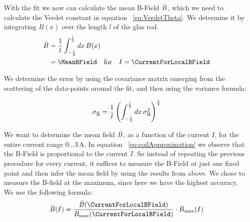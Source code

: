 \documentclass[a4paper,10pt,twocolumn]{article}
\newcommand{\unit}[1]{\, \mathrm{#1}}
\begin{document}
    \newcommand{\lHalf}{\frac{l}{2}}
    \newcommand{\xInteg}{\int_{-\lHalf}^{\lHalf} dx \,}

    With the fit we now can calculate the mean B-Field $\bar{B}$, which we need
    to calculate the Verdet constant in equation ~\eqref{eq:VerdetTheta}.
    We determine it by integrating $B(x)$ over the length $l$ of the glas rod.
    \begin{align}
        \label{eq:meanBFieldInt}
        \begin{split}
        \BMean &= \frac{1}{l} \xInteg B(x) \\
            &= \MeanBField \quad \text{for} \quad I = \CurrentForLocalBField
        \end{split}
    \end{align}

    We determine the error by using the covariance matrix emerging from the scattering of the
    data-points around the fit, and then using the variance formula:

    \begin{align*}
        \sigma_{\mathrm{\BMean}} = \frac{1}{l} \left( \xInteg \sigma_{\mathrm{B}}^2 \right)^{\frac{1}{2}}
    \end{align*}


    We want to determine the mean field $\bar{B}$, as a function of the current $I$, for the entire
    current range $0\dots3\unit{A}$.
    In equation ~\eqref{eq:coilApproximation} we observe that the B-Field is proportional to the
    current $I$.
    So instead of repeating the previous procedure for every current, it suffices to
    measure the B-Field at just one fixed point and then infer the mean field by using the results from above.
    We chose to measure the B-field at the maximum, since here we have the highest accuracy.
    We use the following formula:
    \begin{align}
        \label{eq:meanBFromMaxB}
        \BMean (I) = \frac{\BMean(\CurrentForLocalBField)}{\BMax(\CurrentForLocalBField)} \cdot \BMax(I)
    \end{align}
\end{document}
